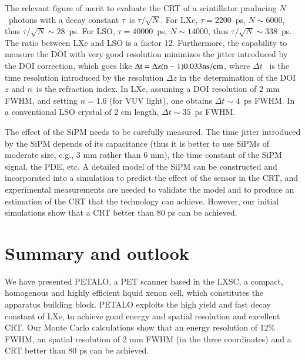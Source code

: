 \documentclass[review]{elsarticle}
\begin{document}
The relevant figure of merit to evaluate the CRT of a scintillator producing $N$~photons with a decay constant $\tau$~is $\tau/\sqrt{N}$. For LXe, $\tau=2200$~ps, $N \sim 6000$, thus 
$\tau/\sqrt{N} \sim 28$~ps. For LSO, $\tau=40000$~ps, $N \sim 14000$, thus 
$\tau/\sqrt{N} \sim 338$~ps. The ratio between LXe and LSO is a factor 12. 
Furthermore, the capability to measure the DOI with very good resolution minimizes the jitter introduced by the DOI correction, which goes like
${\rm \Delta t = \Delta z (n - 1) 0.033 ns/cm}$, where $\Delta t$~ is the time resolution introduced by the resolution $\Delta z$ in the determination of the DOI $z$ and $n$~is the refraction index. In LXe, assuming a DOI resolution of 2 mm FWHM, and setting $n=1.6$ (for VUV light), one obtains $\Delta t \sim 4$~ps FWHM. In a conventional LSO crystal of 2 cm length, $\Delta t \sim 35$~ps FWHM.

The effect of the SiPM needs to be carefully measured. The time jitter introduced by the SiPM depends of its capacitance (thus it is better to use SiPMs of moderate size, e.g., 3 mm rather than 6 mm), the time constant of the SiPM signal, the PDE, etc. A detailed model of the SiPM can be constructed and incorporated into a simulation to predict the effect of the sensor in the CRT, and experimental measurements are needed to validate the model and to produce an estimation of the CRT that the technology can achieve. However, our initial simulations show that a CRT better than 80 ps can be achieved. 


\section{Summary and outlook}
We have presented PETALO, a PET scanner based in the LXSC, a compact, homogenous and highly efficient liquid xenon cell, which constitutes the apparatus building block. PETALO exploits the high yield and fast decay constant of LXe, to achieve good energy and spatial resolution and excellent CRT. Our Monte Carlo calculations show that an energy resolution of 12\% FWHM, an spatial resolution of 2 mm FWHM (in the three coordinates) and a CRT better than 80 ps can be achieved. 
\end{document}
